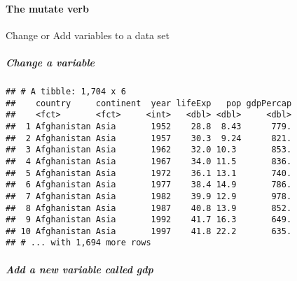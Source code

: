 \documentclass[]{article}
\newenvironment{Shaded}{\begin{snugshade}}{\end{snugshade}}
\newcommand{\KeywordTok}[1]{\textcolor[rgb]{0.13,0.29,0.53}{\textbf{#1}}}
\newcommand{\DataTypeTok}[1]{\textcolor[rgb]{0.13,0.29,0.53}{#1}}
\newcommand{\DecValTok}[1]{\textcolor[rgb]{0.00,0.00,0.81}{#1}}
\newcommand{\StringTok}[1]{\textcolor[rgb]{0.31,0.60,0.02}{#1}}
\newcommand{\OperatorTok}[1]{\textcolor[rgb]{0.81,0.36,0.00}{\textbf{#1}}}
\newcommand{\NormalTok}[1]{#1}
\let\oldparagraph\paragraph
\renewcommand{\paragraph}[1]{\oldparagraph{#1}\mbox{}}
\let\oldsubparagraph\subparagraph
\renewcommand{\subparagraph}[1]{\oldsubparagraph{#1}\mbox{}}
\begin{document}
\paragraph{The mutate verb}\label{the-mutate-verb}

Change or Add variables to a data set

\subparagraph{Change a variable}\label{change-a-variable}

\begin{Shaded}
\end{Shaded}

\begin{verbatim}
## # A tibble: 1,704 x 6
##    country     continent  year lifeExp   pop gdpPercap
##    <fct>       <fct>     <int>   <dbl> <dbl>     <dbl>
##  1 Afghanistan Asia       1952    28.8  8.43      779.
##  2 Afghanistan Asia       1957    30.3  9.24      821.
##  3 Afghanistan Asia       1962    32.0 10.3       853.
##  4 Afghanistan Asia       1967    34.0 11.5       836.
##  5 Afghanistan Asia       1972    36.1 13.1       740.
##  6 Afghanistan Asia       1977    38.4 14.9       786.
##  7 Afghanistan Asia       1982    39.9 12.9       978.
##  8 Afghanistan Asia       1987    40.8 13.9       852.
##  9 Afghanistan Asia       1992    41.7 16.3       649.
## 10 Afghanistan Asia       1997    41.8 22.2       635.
## # ... with 1,694 more rows
\end{verbatim}

\subparagraph{Add a new variable called
gdp}\label{add-a-new-variable-called-gdp}

\begin{Shaded}
\end{Shaded}
\end{document}

